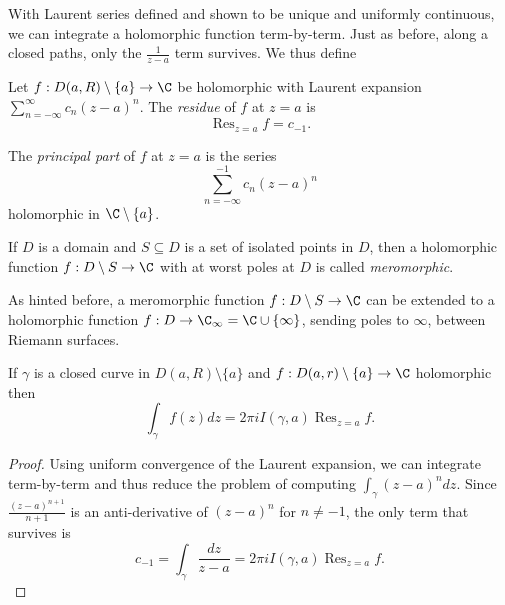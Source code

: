\documentclass[a4paper]{article}
\DeclareMathOperator*{\res}{Res}
\begin{document}
With Laurent series defined and shown to be unique and uniformly continuous, we can integrate a holomorphic function term-by-term. Just as before, along a closed paths, only the \(\frac{1}{z - a}\) term survives. We thus define

\begin{definition}[Residue]
  Let \(f: D(a, R) \setminus \{a\} \to \C\) be holomorphic with Laurent expansion \(\sum_{n = -\infty}^\infty c_n(z - a)^n\). The \emph{residue} of \(f\) at \(z = a\) is
  \[
    \res_{z = a} f = c_{-1}.
  \]
\end{definition}

\begin{definition}
  The \emph{principal part} of \(f\) at \(z = a\) is the series
  \[
    \sum_{n = -\infty}^{-1} c_n(z - a)^n
  \]
  holomorphic in \(\C \setminus \{a\}\).
\end{definition}

\begin{definition}[Meromorphic]
  If \(D\) is a domain and \(S \subseteq D\) is a set of isolated points in \(D\), then a holomorphic function \(f: D \setminus S \to \C\) with at worst poles at \(D\) is called \emph{meromorphic}.
\end{definition}

\begin{remark}
  As hinted before, a meromorphic function \(f: D \setminus S \to \C\) can be extended to a holomorphic function \(f: D \to \C_\infty = \C \cup \{\infty\}\), sending poles to \(\infty\), between Riemann surfaces.
\end{remark}

\begin{proposition}
  If \(\gamma\) is a closed curve in \(D(a, R) \setminus \{a\}\) and \(f: D(a, r) \setminus \{a\} \to \C\) holomorphic then
  \[
    \int_\gamma f(z) dz = 2\pi i I(\gamma, a) \res_{z = a} f.
  \]
\end{proposition}

\begin{proof}
  Using uniform convergence of the Laurent expansion, we can integrate term-by-term and thus reduce the problem of computing \(\int_\gamma (z - a)^n dz\). Since \(\frac{(z - a)^{n + 1}}{n + 1}\) is an anti-derivative of \((z - a)^n\) for \(n \neq -1\), the only term that survives is
  \[
    c_{-1} = \int_\gamma \frac{dz}{z - a} = 2\pi i I(\gamma, a) \res_{z = a} f.
  \]
\end{proof}
\end{document}
